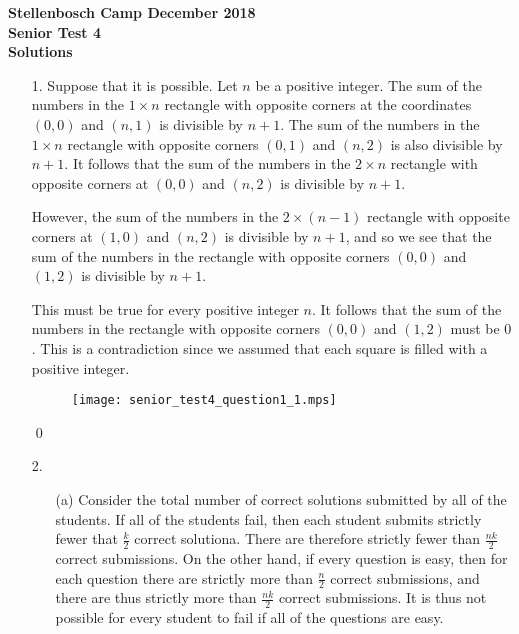 \documentclass[a4paper, 12pt]{article}
\begin{document}
\begin{center}
\textbf{Stellenbosch Camp December 2018 \\ Senior Test 4} \\
\textbf{Solutions}
\end{center}
\vspace{5mm}

\begin{enumerate}
    
\item[1.] 
Suppose that it is possible. Let $n$ be a positive integer. The sum of the numbers in the $1 \times n$ rectangle with opposite corners at the coordinates $(0, 0)$ and $(n, 1)$ is divisible by $n + 1$. The sum of the numbers in the $1 \times n$ rectangle with opposite corners $(0, 1)$ and $(n, 2)$ is also divisible by $n + 1$. It follows that the sum of the numbers in the $2 \times n$ rectangle with opposite corners at $(0, 0)$ and $(n, 2)$ is divisible by $n + 1$.

However, the sum of the numbers in the $2 \times (n - 1)$ rectangle with opposite corners at $(1, 0)$ and $(n, 2)$ is divisible by $n + 1$, and so we see that the sum of the numbers in the rectangle with opposite corners $(0, 0)$ and $(1, 2)$ is divisible by $n + 1$.

This must be true for every positive integer $n$. It follows that the sum of the numbers in the rectangle with opposite corners $(0, 0)$ and $(1, 2)$ must be $0$. This is a contradiction since we assumed that each square is filled with a positive integer.

\begin{figure}[H]
\centering
\texttt{[image: senior\_test4\_question1\_1.mps]}
\end{figure}

\qed
\vspace{5mm}


\item[2.]

\begin{enumerate}
\item[(a)] Consider the total number of correct solutions submitted by all of the students. If all of the students fail, then each student submits strictly fewer that $\frac{k}{2}$ correct solutiona. There are therefore strictly fewer than $\frac{nk}{2}$ correct submissions. On the other hand, if every question is easy, then for each question there are strictly more than $\frac{n}{2}$ correct submissions, and there are thus strictly more than $\frac{nk}{2}$ correct submissions. It is thus not possible for every student to fail if all of the questions are easy.


\end{enumerate}
\end{enumerate}
\end{document}
